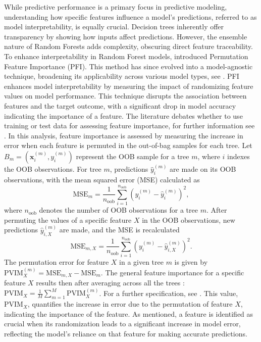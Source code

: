 \documentclass[12pt]{article}
\begin{document}
While predictive performance is a primary focus in predictive modeling, understanding how specific features influence a model’s predictions, referred to as model interpretability, is equally crucial. 
Decision trees inherently offer transparency by showing how inputs affect predictions. However, the ensemble nature of Random Forests adds complexity, obscuring direct feature traceability.
To enhance interpretability in Random Forest models, \citet{article} introduced Permutation Feature Importance (PFI). 
This method has since evolved into a model-agnostic technique, broadening its applicability across various model types, see \citep{fisher2019models}.
PFI enhances model interpretability by measuring the impact of randomizing feature values on model performance.
This technique disrupts the association between features and the target outcome, with a significant drop in model accuracy indicating the importance of a feature.
The literature debates whether to use training or test data for assessing feature importance, for further information see \citep[Section~8.5.2]{molnar2022}. In this analysis,
feature importance is assessed by measuring the increase in error when each feature is permuted in the out-of-bag samples for each tree.
Let $B_m=(\textbf{x}^{(m)}_i,y^{(m)}_i)$ represent the OOB sample for a tree $m$, where $i$ indexes the OOB observations. For tree $m$, predictions $\hat{y}^{(m)}_i$  are made on its OOB observations, with the mean squared error (MSE) calculated as 
\begin{equation}
\text{MSE}_m = \frac{1}{n_\text{oob}}\sum_{i=1}^{n_\text{oob}}(y^{(m)}_i-\hat{y}^{(m)}_i)^2,
\end{equation}
where $n_{\text{oob}}$  denotes the number of OOB observations for a tree $m$. 
After permuting the values of a specific feature $X$ in the OOB observations, new predictions $\hat{y}^{(m)}_{i,X}$ are made, and the MSE is recalculated
\begin{equation}
\text{MSE}_{m,X} = \frac{1}{n_\text{oob}}\sum_{i=1}^{n_\text{oob}}(y^{(m)}_i-\hat{y}^{(m)}_{i,X})^2.
\end{equation}
The permutation error for feature $X$  in a given tree $m$ is given by
$
\text{PVIM}^{(m)}_X=\text{MSE}_{m,X}-\text{MSE}_m.$ The general feature importance for a specific feature $X$ results then after averaging across all the trees : $ \text{PVIM}_{X} = \frac{1}{M}\sum_{m =1}^{M} \text{PVIM}^{(m)}_X$.
For a further specification, see \citep[Section~6.2.2]{wei}.
This value, $\text{PVIM}_X$, quantifies the increase in error due to the permutation of feature $X$, indicating the importance of the feature. As mentioned, a feature is identified as crucial when its randomization leads to a significant increase in model error, reflecting the model's reliance on that feature for making accurate predictions.
\end{document}
